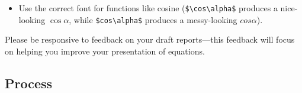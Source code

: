 \documentclass[12pt]{article}
\begin{document}
\begin{itemize}
\begin{quote}
\begin{lstlisting}[language={[LaTeX]TeX}]
c_{D} &= 2\sin^{2}\alpha
\end{align*}
\end{lstlisting}
\end{quote}
produces the nice-looking result
\begin{align*}
c_{L} &= 2\sin\alpha \cos\alpha \\ 
c_{D} &= 2\sin^{2}\alpha
\end{align*}
while
\begin{quote}
\begin{lstlisting}[language={[LaTeX]TeX}]
\begin{equation*}
c_{L} = 2\sin\alpha \cos\alpha
\end{equation*}
\begin{equation*}
c_{D} = 2\sin^{2}\alpha
\end{equation*}
\end{lstlisting}
\end{quote}
produces the messy-looking result
\begin{equation*}
c_{L} = 2\sin\alpha \cos\alpha
\end{equation*}
\begin{equation*}
c_{D} = 2\sin^{2}\alpha.
\end{equation*}
\item Use the correct font for functions like cosine (\lstinline|$\cos\alpha$| produces a nice-looking $\cos\alpha$, while \lstinline|$cos\alpha$| produces a messy-looking $cos\alpha$).
\end{itemize}
Please be responsive to feedback on your draft reports---this feedback will focus on helping you improve your presentation of equations.


\subsection{Process}
\label{sec:process}
\end{document}
